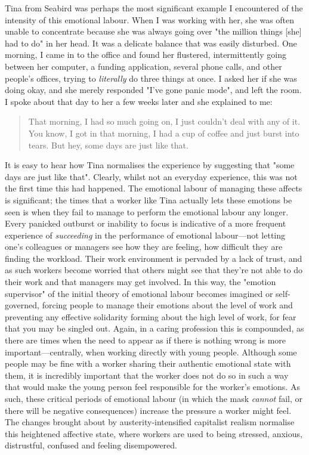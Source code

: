 Tina from Seabird was perhaps the most significant example I encountered of the intensity of this emotional labour. When I was working with her, she was often unable to concentrate because she was always going over "the million things [she] had to do" in her head. It was a delicate balance that was easily disturbed. One morning, I came in to the office and found her flustered, intermittently going between her computer, a funding application, several phone calls, and other people's offices, trying to \emph{literally} do three things at once. I asked her if she was doing okay, and she merely responded "I've gone panic mode", and left the room. I spoke about that day to her a few weeks later and she explained to me: 
\begin{quote} 
That morning, I had so much going on, I just couldn't deal with any of it. You know, I got in that morning, I had a cup of coffee and just burst into tears. But hey, some days are just like that.
\end{quote}
It is easy to hear how Tina normalises the experience by suggesting that "some days are just like that". Clearly, whilst not an everyday experience, this was not the first time this had happened. The emotional labour of managing these affects is significant; the times that a worker like Tina actually lets these emotions be seen is when they fail to manage to perform the emotional labour any longer. Every panicked outburst or inability to focus is indicative of a more frequent experience of \emph{succeeding} in the performance of emotional labour—not letting one's colleagues or managers see how they are feeling, how difficult they are finding the workload. Their work environment is pervaded by a lack of trust, and as such workers become worried that others might see that they’re not able to do their work and that managers may get involved. In this way, the "emotion supervisor" of the initial theory of emotional labour becomes imagined or self-governed, forcing people to manage their emotions about the level of work and preventing any effective solidarity forming about the high level of work, for fear that you may be singled out. Again, in a caring profession this is compounded, as there are times when the need to appear as if there is nothing wrong is more important—centrally, when working directly with young people. Although some people may be fine with a worker sharing their authentic emotional state with them, it is incredibly important that the worker does not do so in such a way that would make the young person feel responsible for the worker's emotions. As such, these critical periods of emotional labour (in which the mask \emph{cannot} fail, or there will be negative consequences) increase the pressure a worker might feel. The changes brought about by austerity-intensified capitalist realism normalise this heightened affective state, where workers are used to being stressed, anxious, distrustful, confused and feeling disempowered.

